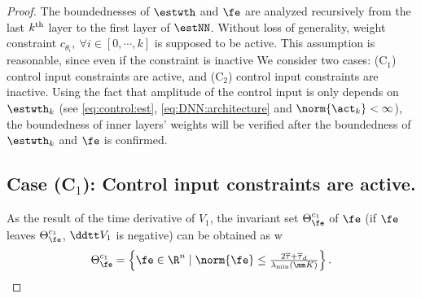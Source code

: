 \documentclass[lettersize,journal]{IEEEtran}
\begin{document}
\begin{proof}

The boundednesses of $\estwth$ and $\fe$ are analyzed recursively from the last $k\textsuperscript{th}$ layer to the first layer of $\estNN$. 
Without loss of generality, weight constraint $c_{\theta_i},\ \forall i\in[0,\cdots,k]$ is supposed to be active.
This assumption is reasonable, since even if the constraint is inactive 
We consider two cases: (C$_1$) control input constraints are active, and (C$_2$) control input constraints are inactive.
Using the fact that amplitude of the control input is only depends on $\estwth_k$ (\ie see \eqref{eq:control:est}, \eqref{eq:DNN:architecture} and $\norm{\act_k}<\infty$), the boundedness of inner layers' weights will be verified after the boundedness of $\estwth_k$ and $\fe$ is confirmed. 

\subsection*{Case (C$_1$): Control input constraints are active.}

As the result of the time derivative of $V_1$, the invariant set $\Theta_{\fe}^{c_1}$ of $\fe$ (\ie if $\fe$ leaves $\Theta_{\fe}^{c_1}$, $\ddtt V_1$ is negative) can be obtained as w
\begin{equation}
    \Theta_{\fe}^{c_1} 
    = 
    \left\{ 
        \fe \in \R^n 
        \mid 
        \norm{\fe} 
        \le 
        \tfrac{2\overline\tau+\overline\tau_d}{\lambda_{\min}(\mm K)}
    \right\}
    .
    \label{eq:invariant:c1:fe}
\end{equation}


\end{proof}
\end{document}
